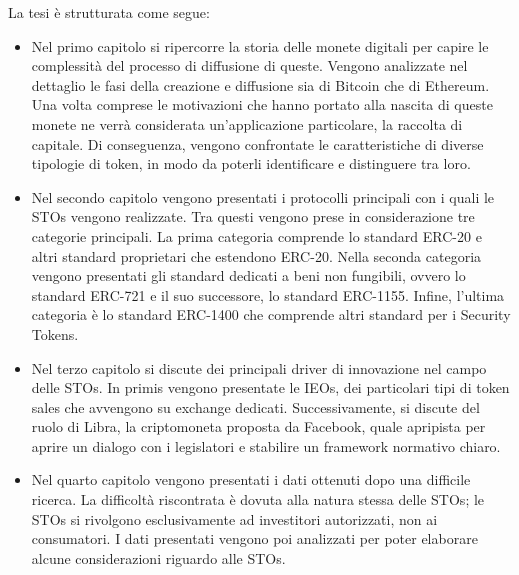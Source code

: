 La tesi è strutturata come segue:
\begin{itemize}
    \item Nel primo capitolo si ripercorre la storia delle monete digitali per capire le complessità del processo di diffusione di queste. Vengono analizzate nel dettaglio le fasi della creazione e diffusione sia di Bitcoin che di Ethereum. Una volta comprese le motivazioni che hanno portato alla nascita di queste monete ne verrà considerata un'applicazione particolare, la raccolta di capitale. Di conseguenza, vengono confrontate le caratteristiche di diverse tipologie di token, in modo da poterli identificare e distinguere tra loro. 
    
    \item Nel secondo capitolo vengono presentati i protocolli principali con i quali le STOs vengono realizzate. Tra questi vengono prese in considerazione tre categorie principali. La prima categoria comprende lo standard ERC-20 e altri standard proprietari che estendono ERC-20. Nella seconda categoria vengono presentati gli standard dedicati a beni non fungibili, ovvero lo standard ERC-721 e il suo successore, lo standard ERC-1155. Infine, l'ultima categoria è lo standard ERC-1400 che comprende altri standard per i Security Tokens. 
    
    \item Nel terzo capitolo si discute dei principali driver di innovazione nel campo delle STOs. In primis vengono presentate le IEOs, dei particolari tipi di token sales che avvengono su exchange dedicati.  Successivamente, si discute del ruolo di Libra, la criptomoneta proposta da Facebook, quale apripista per aprire un dialogo con i legislatori e stabilire un framework normativo chiaro. 
    
    \item Nel quarto capitolo vengono presentati i dati 
    ottenuti dopo una difficile ricerca. La difficoltà riscontrata è dovuta alla natura stessa delle STOs; le STOs si rivolgono esclusivamente ad investitori autorizzati, non ai consumatori. I dati presentati vengono poi analizzati per poter elaborare alcune considerazioni riguardo alle STOs. 
\end{itemize}




\clearpage{\pagestyle{empty}\cleardoublepage}